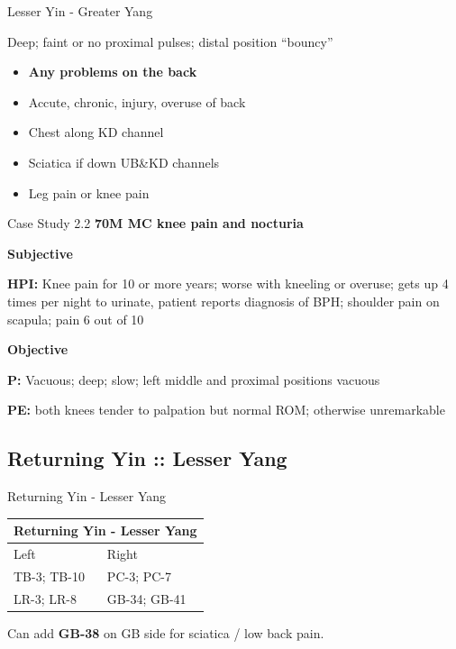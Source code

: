 \begin{frame}{Lesser Yin - Greater Yang}

\begin{pulse}
Deep; faint or no proximal pulses; distal position ``bouncy''
\end{pulse}

\begin{itemize}
\item \textbf{Any problems on the back}
\item Accute, chronic, injury, overuse of back
\item Chest along KD channel 
\item Sciatica if down UB\&KD channels
\item Leg pain or knee pain
\end{itemize}

\end{frame}

\begin{frame}{Case Study 2.2}
  \textbf{\Large 70M MC knee pain and nocturia}
  
  \textbf{\large Subjective}
  
  \textbf{HPI:} Knee pain for 10 or more years; worse with kneeling or overuse; gets up 4 times per night to urinate, patient reports diagnosis of BPH; shoulder pain on scapula; pain 6 out of 10

  \textbf{\large Objective}
  
  \textbf{P:} Vacuous; deep; slow; left middle and proximal positions vacuous

  \textbf{PE:} both knees tender to palpation but normal ROM; otherwise unremarkable

\end{frame}

\subsection{Returning Yin :: Lesser Yang}

\begin{frame}{Returning Yin - Lesser Yang}

\begin{table}[]
\begin{tabular}{@{}ll@{}}
\toprule
\multicolumn{2}{l}{Returning Yin - Lesser Yang} \\ \midrule
Left                   & Right                  \\
TB-3; TB-10            & PC-3; PC-7             \\
LR-3; LR-8             & GB-34; GB-41           \\ \bottomrule
\end{tabular}
\end{table}

\vspace{2em}

Can add \textbf{GB-38} on GB side for sciatica / low back pain.

\end{frame}

